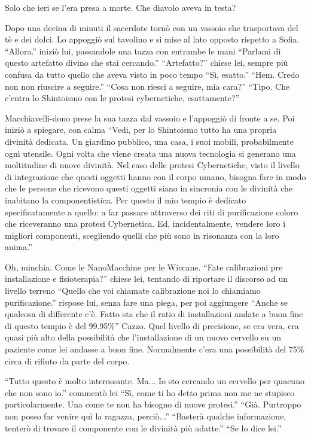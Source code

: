     Solo che ieri se l'era presa a morte. Che diavolo aveva in testa?

    Dopo una decina di minuti il sacerdote tornò con un vassoio che trasportava del tè e dei dolci. Lo appoggiò sul
    tavolino e si mise al lato opposto rispetto a Sofia. ``Allora.'' iniziò lui, passandole una tazza con entrambe le
    mani ``Parlami di questo artefatto divino che stai cercando.'' ``Artefatto?'' chiese lei, sempre più confusa da
    tutto quello che aveva visto in poco tempo ``Sì, esatto.'' ``Hem. Credo non non riuscire a seguire.'' ``Cosa non
    riesci a seguire, mia cara?'' ``Tipo. Che c'entra lo Shintoismo con le protesi cybernetiche, esattamente?''

    Macchiavelli-dono prese la sua tazza dal vassoio e l'appoggiò di fronte a se. Poi iniziò a spiegare, con calma
    ``Vedi, per lo Shintoismo tutto ha una propria divinità dedicata. Un giardino pubblico, una casa, i suoi mobili,
    probabilmente ogni utensile. Ogni volta che viene creata una nuova tecnologia si generano una moltitudine di nuove
    divinità. Nel caso delle protesi Cybernetiche, visto il livello di integrazione che questi oggetti hanno con il
    corpo umano, bisogna fare in modo che le persone che ricevono questi oggetti siano in sincronia con le divinità che
    inabitano la componentistica. Per questo il mio tempio è dedicato specificatamente a quello: a far passare
    attraverso dei riti di purificazione coloro che riceveranno una protesi Cybernetica. Ed, incidentalmente, vendere
    loro i migliori componenti, scegliendo quelli che più sono in risonanza con la loro anima.''

    Oh, minchia. Come le NanoMacchine per le Wiccane. ``Fate calibrazioni pre installazione e fisioterapia?'' chiese
    lei, tentando di riportare il discorso ad un livello terreno ``Quello che voi chiamate calibrazione noi lo chiamiamo
    purificazione.'' rispose lui, senza fare una piega, per poi aggiungere ``Anche se qualcosa di differente c'è. Fatto
    sta che il ratio di installazioni andate a buon fine di questo tempio è del 99.95\%'' Cazzo. Quel livello di
    precisione, se era vera, era quasi più alto della possibilità che l'installazione di un nuovo cervello su un
    paziente come lei andasse a buon fine. Normalmente c'era una possibilità del 75\% circa di rifiuto da parte del
    corpo.

    ``Tutto questo è molto interessante. Ma... Io sto cercando un cervello per quacuno che non sono io.'' commentò lei
    ``Sì, come ti ho detto prima non me ne stupisco particolarmente. Una come te non ha bisogno di nuove protesi.''
    ``Già. Purtroppo non posso far venire quì la ragazza, perciò...'' ``Basterà qualche informazione, tenterò di trovare
    il componente con le divinità più adatte.'' ``Se lo dice lei.''

